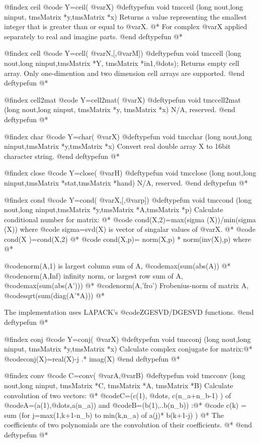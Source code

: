 @findex  ceil
@code{  Y=ceil( @var{X})}
@deftypefun void tmcceil (long nout,long ninput, tmsMatrix *y,tmsMatrix *x)
Returns a value representing the smallest integer that is greater than or equal to @var{X}. @*
For complex @var{X} applied separately to real and imagine parts.
@end deftypefun
@*

@findex  cell
@code{ Y=cell( @var{N},[,@var{M}])}
@deftypefun void tmccell (long nout,long ninput,tmsMatrix *Y, tmsMatrix *in1,@dots{});
Returns empty cell array. Only one-dimention and two dimension cell arrays are supported.
@end deftypefun
@*

@findex  cell2mat
@code{  Y=cell2mat( @var{X})}
@deftypefun void tmccell2mat (long nout,long ninput, tmsMatrix *y, tmsMatrix *x)
N/A, reserved.
@end deftypefun
@*

@findex  char
@code{  Y=char( @var{X})}
@deftypefun void tmcchar (long nout,long ninput,tmsMatrix *y,tmsMatrix *x)
Convert real double array X to 16bit character string.
@end deftypefun
@*

@findex  close
@code{  Y=close( @var{H})}
@deftypefun void tmcclose (long nout,long ninput,tmsMatrix *stat,tmsMatrix *hand)
N/A, reserved.
@end deftypefun
@*

@findex  cond
@code{ Y=cond( @var{X},[,@var{p}])}
@deftypefun void tmccond (long nout,long ninput,tmsMatrix *y,tmsMatrix *A,tmsMatrix *p)
Calculate conditional number for matrix: @*
 @code{ cond(X,2)=max(sigma (X))/min(sigma (X))} where @code{ sigma=svd(X)} is vector of singalar values of @var{X}. @*
 @code{ cond(X )=cond(X,2)} @*
@code{ cond(X,p)= norm(X,p) * norm(inv(X),p) } where @*

@code{norm(A,1)} is largest column sum of A, @code{max(sum(abs(A))} @*
@code{norm(A,Inf)} infinity norm, or largest row sum of A, @code{max(sum(abs(A')))} @*
@code{norm(A,'fro')}   Frobenius-norm of matrix A, @code{sqrt(sum(diag(A'*A)))} @*

The implementation uses LAPACK's @code{ZGESVD/DGESVD} functions.
@end deftypefun
@*

@findex  conj
@code{  Y=conj( @var{X})}
@deftypefun void tmcconj (long nout,long ninput, tmsMatrix *y,tmsMatrix *x)
Calculate complex conjugate for matrix:@*
 @code{conj(X)=real(X)-j .* imag(X)}
@end deftypefun
@*

@findex   conv
@code{  C=conv( @var{A},@var{B})}
@deftypefun void tmcconv (long nout,long ninput, tmsMatrix *C, tmsMatrix *A, tmsMatrix *B)
Calculate convolution of two vectors: @*
@code{C=(c(1), @dots{}, c(n_a+n_b-1) )} of  @code{A=(a(1),@dots{},a(n_a))} and @code{B=(b(1),..b(n_b)) }:@*
@code{   c(k) = sum (for j=max(1,k+1-n_b)  to  min(k,n_a) of  a(j)* b(k+1-j) )} @*
 The coefficients of two polynomials are the convolution of their coefficients. @*
@end deftypefun
@*

